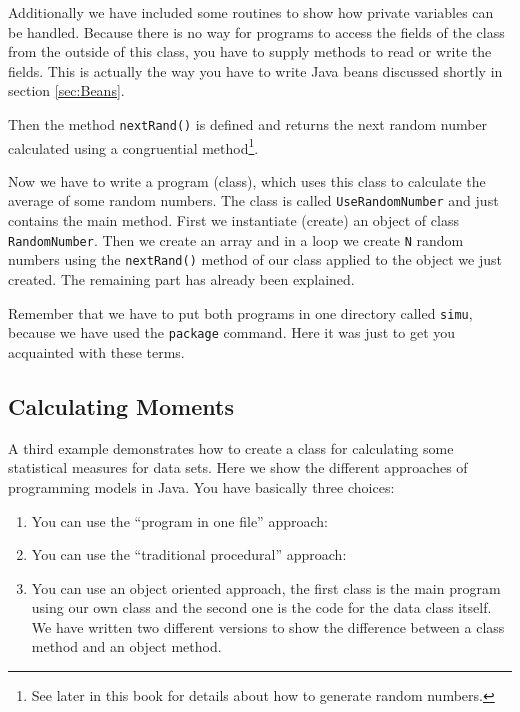 Additionally we have included some routines to show how
private variables can be handled. Because there is no
way for programs to access the fields of the class from
the outside of this class, you have to supply methods to read
or write the fields. This is actually the way you have to write
Java beans discussed shortly in section \ref{sec:Beans}.

Then the method \verb|nextRand()| is defined and returns the next
random number calculated using a congruential method\footnote{See later 
in this book for details about how to generate random numbers.}. 

Now we have to write a program (class), which uses this class to 
calculate the average of some random numbers.
The class is called \verb|UseRandomNumber| and just contains the
main method. First we instantiate (create) an object of class
\verb|RandomNumber|. Then we create an array and in a loop we
create \verb|N| random numbers using the \verb|nextRand()| method
of our class applied to the object we just created. The remaining
part has already been explained.

Remember that we have to put both programs in one directory called
\verb|simu|, because we have used the \verb|package| command. Here it
was just to get you acquainted with these terms.

\subsection{Calculating Moments}
A third example demonstrates how to create a class for calculating
some statistical measures for data sets. Here we show the
different approaches of programming models in Java. 
You have basically three choices:
\begin{enumerate}
\item You can use the ``program in one file'' approach: 

\item You can use the ``traditional procedural'' approach:


\item You can use an object oriented approach, the first class is
  the main program using our own class and the second one is the
  code for the data class itself. We have written two different 
  versions to show the difference between a class method and 
  an object method.
  
  
\end{enumerate}

